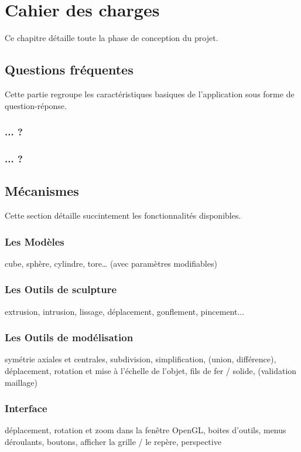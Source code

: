 \documentclass[a4paper]{memoir}
\begin{document}
	\chapter{Cahier des charges}
		Ce chapitre détaille toute la phase de conception du projet.
	
		\section{Questions fréquentes}
			Cette partie regroupe les caractéristiques basiques de l'application sous forme de question-réponse.
		
			\subsection{... ?}
				
			\subsection{... ?}
				
			
		\section{Mécanismes}
			Cette section détaille succintement les fonctionnalités disponibles.
			
			\subsection{Les Modèles}
				cube, sphère, cylindre, tore… (avec paramètres modifiables)

			\subsection{Les Outils de sculpture}
				extrusion, intrusion, lissage, déplacement, gonflement, pincement...

			\subsection{Les Outils de modélisation}
				symétrie axiales et centrales, subdivision, simplification, (union, différence), déplacement, rotation et mise à l'échelle de l'objet, fils de fer / solide, (validation maillage)

			\subsection{Interface}
				déplacement, rotation et zoom dans la fenêtre OpenGL, boites d'outils, menus déroulants, boutons, afficher la grille / le repère, perspective
\end{document}
